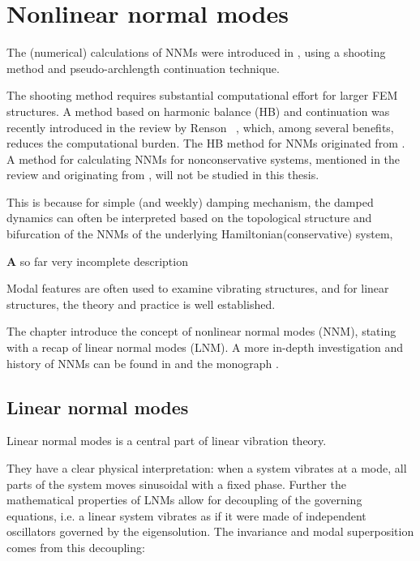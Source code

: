 
\section{Nonlinear normal modes}
\label{sec:nonl-norm-modes}

The (numerical) calculations of NNMs were introduced in
\textcite{kerschen2009b}, using a shooting method and pseudo-archlength
continuation technique.

The shooting method requires substantial computational effort for larger FEM
structures. A method based on harmonic balance (HB) and continuation was
recently introduced in the review by Renson~ \autocite{renson2016a}, which, among several
benefits, reduces the computational burden. The HB method for NNMs originated
from \textcite{detroux2016a}. A method for calculating NNMs for nonconservative
systems, mentioned in the review and originating from \textcite{renson2014_phd},
will not be studied in this thesis.

This is because for simple (and weekly) damping mechanism, the damped dynamics
can often be interpreted based on the topological structure and bifurcation of
the NNMs of the underlying Hamiltonian(conservative) system,
\autocite[sec. 4]{renson2016a}

{\textbf A so far very incomplete description}

Modal features are often used to examine vibrating structures, and for linear
structures, the theory and practice is well established.

The chapter introduce the concept of nonlinear normal modes (NNM), stating with
a recap of linear normal modes (LNM). A more in-depth investigation and history
of NNMs can be found in \citep{kerschen2009a} and the monograph \citep[chap
2.]{vakakis2008a}.


\subsection{Linear normal modes}
\label{sec:linear-normal-modes}


Linear normal modes is a central part of linear vibration theory.

They have a clear physical interpretation: when a system vibrates at a mode, all
parts of the system moves sinusoidal with a fixed phase.
Further the mathematical properties of LNMs allow for decoupling of the
governing equations, i.e. a linear system vibrates as if it were made of
independent oscillators governed by the eigensolution. The invariance and modal
superposition comes from this decoupling:

